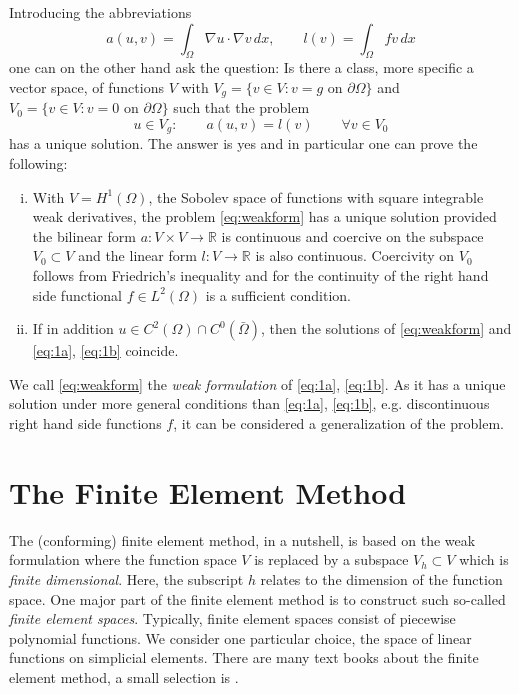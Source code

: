 \documentclass[a4paper,12pt]{article}
\begin{document}
Introducing the abbreviations
\begin{equation}
a(u,v) = \int_\Omega \nabla u \cdot \nabla v \,dx, \qquad l(v) = \int_\Omega fv \,dx
\end{equation}
one can on the other hand ask the question: Is there a class,
more specific a vector space, of functions $V$ with $V_g=\{v\in V : 
\text{$v=g$ on $\partial\Omega$}\}$ and $V_0=\{v\in V : 
\text{$v=0$ on $\partial\Omega$}\}$ such that
the problem
\begin{equation}
u \in V_g :\qquad a(u,v) = l(v) \qquad \forall v\in V_0 \label{eq:weakform}
\end{equation}
has a unique solution. The answer is yes and in particular one can prove the following:
\begin{enumerate}[i)]
\item With $V=H^1(\Omega)$, the Sobolev space of functions with square integrable
weak derivatives, the problem \eqref{eq:weakform} has a unique solution provided
the bilinear form $a : V\times V \to \mathbb{R}$ is continuous and coercive on the 
subspace $V_0\subset V$ and the linear form $l: V \to \mathbb{R}$ is also continuous. 
Coercivity on $V_0$ follows from Friedrich's inequality and for the continuity of the right hand
side functional $f\in L^2(\Omega)$ is a sufficient condition.
\item If in addition $u\in C^2(\Omega)\cap C^0(\bar\Omega)$, then the solutions
of \eqref{eq:weakform} and \eqref{eq:1a}, \eqref{eq:1b} coincide.
\end{enumerate}
We call \eqref{eq:weakform} the {\em weak formulation} of \eqref{eq:1a}, \eqref{eq:1b}.
As it has a unique solution under more general conditions than \eqref{eq:1a}, \eqref{eq:1b},
e.g. discontinuous right hand side functions $f$, it can be considered a generalization
of the problem.

\section{The Finite Element Method}

The (conforming) finite element method, in a nutshell, is based on the weak formulation where
the function space $V$ is replaced by a subspace $V_h\subset V$ 
which is {\em finite dimensional}. Here, the subscript $h$ relates to the dimension of the
function space. One major part of the finite element method is to construct such
so-called {\em finite element spaces}.
Typically, finite element spaces consist of piecewise polynomial functions.
We consider one particular choice, the space of linear functions on simplicial elements.
There are many text books about the finite element method,
a small selection is
\cite{Eriksson,Ern,Ciarlet,Braess,Brenner,Elman2005,GR,WHElliptisch,RannacherII,BastianII}.
\end{document}
